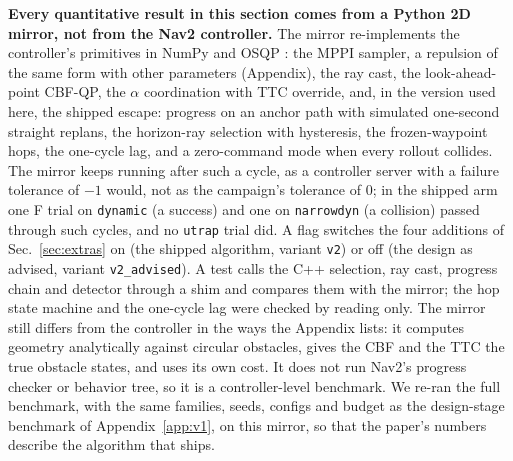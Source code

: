 \documentclass[journal]{IEEEtran}
\begin{document}
\textbf{Every quantitative result in this section comes from a Python 2D
mirror, not from the Nav2 controller.} The mirror re-implements the
controller's primitives in NumPy and OSQP \cite{osqp}: the MPPI sampler, a repulsion of
the same form with other parameters (Appendix), the ray cast, the look-ahead-point CBF-QP, the $\alpha$ coordination with TTC
override, and, in the version used here, the shipped escape: progress on an anchor path
with simulated one-second straight replans, the horizon-ray selection with hysteresis,
the frozen-waypoint hops, the one-cycle lag, and a zero-command mode when every
rollout collides. The mirror keeps running after such a cycle, as a controller server with a
failure tolerance of $-1$ would, not as the campaign's tolerance of $0$; in the shipped arm one
F trial on \texttt{dynamic} (a success) and one on \texttt{narrowdyn} (a collision) passed
through such cycles, and no \texttt{utrap} trial did. A flag switches the four additions of Sec.~\ref{sec:extras} on
(the shipped algorithm, variant \texttt{v2}) or off (the design as advised, variant
\texttt{v2\_advised}). A test calls the C++ selection, ray cast, progress chain and detector through a shim
and compares them with the mirror; the hop state machine and the one-cycle lag were
checked by reading only. The mirror still differs from the controller in the ways
the Appendix lists: it computes geometry analytically against circular obstacles, gives
the CBF and the TTC the true obstacle states, and uses its own cost. It does not run
Nav2's progress checker or behavior tree, so it is a controller-level benchmark. We
re-ran the full benchmark, with the same families, seeds, configs and budget as the
design-stage benchmark of Appendix~\ref{app:v1}, on this mirror, so that the paper's
numbers describe the algorithm that ships.
\end{document}
